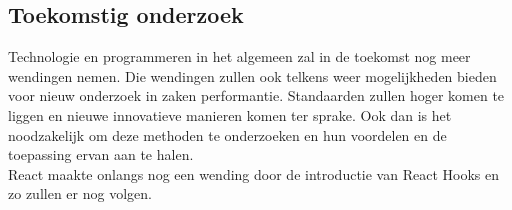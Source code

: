 \documentclass[a0,portrait]{a0poster}
\begin{document}
\begin{multicols}{2}
\color{HoGentAccent1} 
\section*{Toekomstig onderzoek}
\color{black}

Technologie en programmeren in het algemeen zal in de toekomst nog meer wendingen nemen. Die wendingen zullen ook telkens weer mogelijkheden bieden voor nieuw onderzoek in zaken performantie. Standaarden zullen hoger komen te liggen en nieuwe innovatieve manieren komen ter sprake. Ook dan is het noodzakelijk om deze methoden te onderzoeken en hun voordelen en de toepassing ervan aan te halen. \\
React maakte onlangs nog een wending door de introductie van React Hooks en zo zullen er nog volgen.


\end{multicols}
\end{document}
